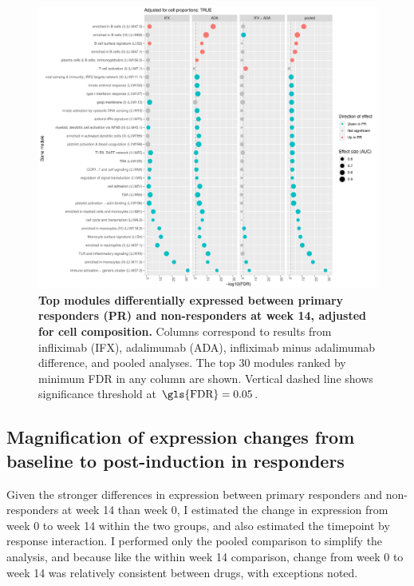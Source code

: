 \begin{figure}
    \centering
    \includegraphics[width=1.0\textwidth,page=1]{mainmatter/figures/chapter_04/plot_gene_set_enrichment.tmodCERNO_panelplot_reversed_C_3RI_3NI,C_3RA_3NA,C_(3RI_3NI)_(3RA_3NA),C_3R_3N.cell_prop_correction_TRUE.pdf}
    \caption[
    ]{
        \textbf{Top modules differentially expressed between primary responders (PR) and non-responders at week 14, adjusted for cell composition.}
        Columns correspond to results from infliximab (IFX), adalimumab (ADA), infliximab minus adalimumab difference, and pooled analyses. 
        The top 30 modules ranked by minimum \gls{FDR} in any column are shown. Vertical dashed line shows significance threshold at $\text{\gls{FDR}} = 0.05$.
    }
    \label{fig:multipants_dge_panelPlot_week_14_R_N_cellPropT}
\end{figure}

\subsection{Magnification of expression changes from baseline to post-induction in responders}

Given the stronger differences in expression between primary responders and non-responders at week 14 than week 0,
I estimated the change in expression from week 0 to week 14 within the two groups, and also estimated the timepoint by response interaction.
I performed only the pooled comparison to simplify the analysis, and because like the within week 14 comparison, change from week 0 to week 14 was relatively consistent between drugs, with exceptions noted.

